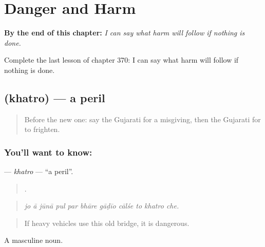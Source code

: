 
\chapter{Danger and Harm}
\label{ch:gu-danger-and-harm}

\begin{chapteropening}
\textbf{By the end of this chapter:} \emph{I can say what harm will follow if nothing is done.}

Complete the last lesson of chapter 370: I can say what harm will follow if nothing is done.
\end{chapteropening}

\section[\texorpdfstring{\gu{ખતરો} (khatro)}{ખતરો (khatro)}]{ (khatro) — a peril}

\label{lesson:GU-C370-khatro}



\begin{quote}
Before the new one: say the Gujarati for a misgiving, then the Gujarati for to frighten.
\end{quote}

\subsection*{You'll want to know: }
\textbf{} — \emph{khatro} — \textquotedblleft{}a peril\textquotedblright{}.

\begin{quote}
          .
\end{quote}

\begin{quote}
\emph{jo ā jūnā pul par bhāre gāḍīo cālśe to khatro che.}
\end{quote}

\begin{quote}
If heavy vehicles use this old bridge, it is dangerous.
\end{quote}

A masculine noun.

